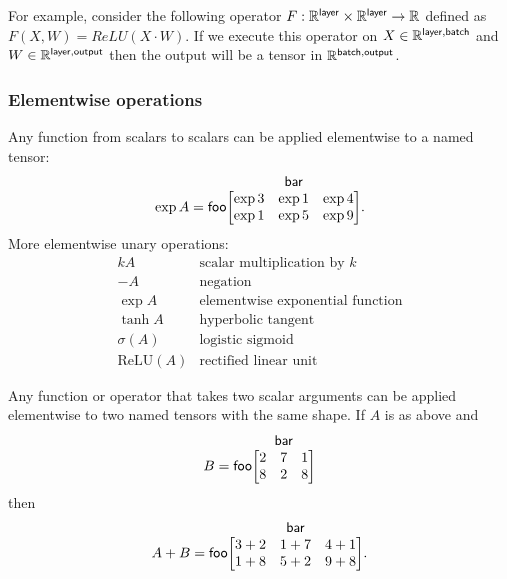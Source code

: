 \documentclass{article}
\makeatletter
\newcommand{\nmatrix}[3]{\name{#1}\begin{array}[b]{@{}c@{}}\name{#2}\\\begin{bmatrix}#3\end{bmatrix}\end{array}}
\makeatother
\begin{document}
For example, consider the following operator $F:\mathbb{R}^{\mathsf{layer}}\times \mathbb{R}^{\mathsf{layer}} \rightarrow \mathbb{R}$ defined as $F(X,W) = ReLU(X \cdot W)$. If we execute this operator on $X\in \mathbb{R}^{\mathsf{layer},\mathsf{batch}}$ and  $W \in \mathbb{R}^{\mathsf{layer},\mathsf{output}}$ then the output will be a tensor in $\mathbb{R}^{\mathsf{batch},\mathsf{output}}$.




\subsubsection{Elementwise operations}

Any function from scalars to scalars can be applied elementwise to a named tensor:
\begin{equation*}
\exp A = \nmatrix{foo}{bar}{
  \exp 3 & \exp 1 & \exp 4 \\
  \exp 1 & \exp 5 & \exp 9
}.
\end{equation*}
More elementwise unary operations:
\[\begin{array}{cl}
kA & \text{scalar multiplication by $k$} \\
-A & \text{negation} \\
\exp A & \text{elementwise exponential function} \\
\tanh A & \text{hyperbolic tangent} \\
\sigma(A) & \text{logistic sigmoid} \\
\text{ReLU}(A) & \text{rectified linear unit}
\end{array}\]

Any function or operator that takes two scalar arguments can be applied elementwise to two named tensors with the same shape. If $A$ is as above and
\begin{equation*}
B = \nmatrix{foo}{bar}{
  2 & 7 & 1 \\
  8 & 2 & 8
}
\end{equation*}
then
\begin{equation*}
A + B = \nmatrix{foo}{bar}{
  3+2 & 1+7 & 4+1 \\
  1+8 & 5+2 & 9+8
}.
\end{equation*}
\end{document}
